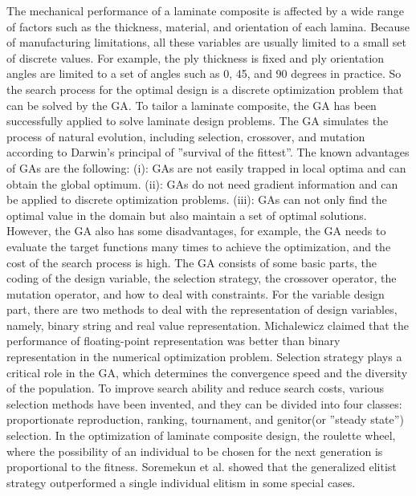 \documentclass[USenglish,twocolumn]{article}
\begin{document}
The mechanical performance of a laminate composite is affected by a wide range of factors such as the
thickness, material, and orientation of each lamina. Because of manufacturing limitations, all these
variables are usually limited to a small set of discrete values. For example, the ply thickness is fixed
and ply orientation angles are limited to a set of angles such as 0, 45, and 90 degrees in practice. So
the search process for the optimal design is a discrete optimization problem that can be solved by the
GA. To tailor a laminate composite, the GA has been successfully applied to solve laminate design
problems\cite{riche1993optimization,nagendra1996improved,sadagopan1998application,todoroki1998stacking,liu2000permutation,sivakumar1998optimum,walker2003technique,lin2004stacking,kang2005minimum,murugan2007target,akbulut2008optimum}.
The GA simulates the process of natural evolution, including selection, crossover, and mutation
according to Darwin's principal of ''survival of the fittest''. The known advantages of GAs are the
following: (i): GAs are not easily trapped in local optima and can obtain the global
optimum. (ii): GAs do not need gradient information and can be applied to discrete optimization
problems. (iii): GAs can not only find the optimal value in the domain but also maintain a
set of optimal solutions. However, the GA also has some disadvantages, for example, the GA
needs to evaluate the target functions many times to achieve the optimization, and the cost of the
search process is high. The GA consists of some basic parts, the coding of the design variable,
the selection strategy, the crossover operator, the mutation operator, and how to deal with constraints. For the
variable design part, there are two methods to deal with the representation of design variables, namely,
binary string and real value representation\cite{riche1993optimization,todoroki1998stacking}.
Michalewicz\cite{zbigniew1996genetic} claimed that the performance of floating-point representation was
better than binary representation in the numerical optimization problem. Selection strategy plays a
critical role in the GA, which determines the convergence speed and the diversity of the population. To
improve search ability and reduce search costs, various selection methods have been invented, and they
can be divided into four classes: proportionate reproduction, ranking, tournament, and
genitor(or ''steady state'') selection. In the optimization of laminate composite design, the roulette
wheel\cite{riche1993optimization,seresta2007optimal}, where the possibility of an individual to be
chosen for the next generation is proportional to the fitness.
Soremekun et al.\cite{soremekun2001composite} showed that the generalized elitist strategy outperformed a
single individual elitism in some special cases.
\end{document}

